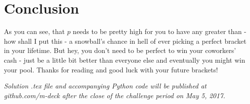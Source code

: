 \documentclass{article}
\begin{document}
\section{Conclusion}
As you can see, that $p$ needs to be pretty high for you to have any greater than - how shall I put this - a snowball's chance in hell of ever picking a perfect bracket in your lifetime. But hey, you don't need to be perfect to win your coworkers' cash - just be a little bit better than everyone else and eventually you might win your pool. Thanks for reading and good luck with your future brackets!\\

\vspace{15mm}

\textit{Solution .tex file and accompanying Python code will be published at github.com/m-deck after the close of the challenge period on May 5, 2017.}
\end{document}
